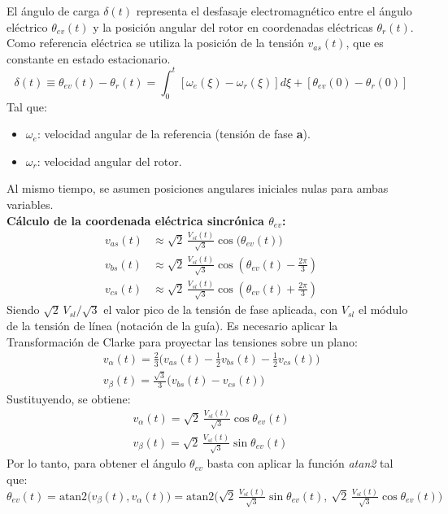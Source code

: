 \documentclass[12pt, a4paper,journal, onecolumn, compsoc]{IEEEtran}
\begin{document}
El ángulo de carga $\delta(t)$ representa el desfasaje electromagnético entre el ángulo eléctrico $\theta_{ev}(t)$ y la posición angular del rotor en coordenadas eléctricas $\theta_r(t)$. Como referencia eléctrica se utiliza la posición de la tensión $v_{as}(t)$, que es constante en estado estacionario.
\begin{equation}\label{eq:angulo_carga}
    \delta(t) \equiv \theta_{ev}(t)-\theta_r(t) = \int_0^t[\omega_e(\xi)-\omega_r(\xi)]d\xi +[\theta_{ev}(0)-\theta_r(0)]
\end{equation}
Tal que:
\begin{itemize}
    \item $\omega_e$: velocidad angular de la referencia (tensión de fase \textbf{a}).
    \item $\omega_r$: velocidad angular del rotor.
\end{itemize}
Al mismo tiempo, se asumen posiciones angulares iniciales nulas para ambas variables.\\
\textbf{Cálculo de la coordenada eléctrica sincrónica $\theta_{ev}$:}
\begin{align*}
v_{as}(t) &\approx \sqrt{2}\,\frac{V_{sl}(t)}{\sqrt{3}} \cos\big(\theta_{ev}(t)\big) \\
v_{bs}(t) &\approx \sqrt{2}\,\frac{V_{sl}(t)}{\sqrt{3}} \cos\left(\theta_{ev}(t) - \frac{2\pi}{3}\right) \\
v_{cs}(t) &\approx \sqrt{2}\,\frac{V_{sl}(t)}{\sqrt{3}} \cos\left(\theta_{ev}(t) + \frac{2\pi}{3}\right)
\end{align*}
Siendo $\sqrt{2}\,V_{sl}/\sqrt{3}$ el valor pico de la tensión de fase aplicada, con $V_{sl}$ el módulo de la tensión de línea (notación de la guía).
Es necesario aplicar la Transformación de Clarke para proyectar las tensiones sobre un plano:
\begin{align*}
    v_{\alpha}(t) = \frac{2}{3}\Big(v_{as}(t) - \frac{1}{2}v_{bs}(t)-\frac{1}{2}v_{cs}(t)\Big) \\
    v_{\beta}(t) = \frac{\sqrt{3}}{3}\big(v_{bs}(t)-v_{cs}(t)\big)
\end{align*}
Sustituyendo, se obtiene:
\begin{align}
    v_{\alpha}(t) = \sqrt{2}\,\tfrac{V_{sl}(t)}{\sqrt{3}} \cos{\theta_{ev}(t)} \\
    v_{\beta}(t) = \sqrt{2}\,\tfrac{V_{sl}(t)}{\sqrt{3}} \sin{\theta_{ev}(t)}
\end{align}
Por lo tanto, para obtener el ángulo $\theta_{ev}$ basta con aplicar la función \textit{atan2} tal que:
\begin{equation}
    \theta_{ev}(t) = \text{atan2}\big(v_{\beta}(t),v_{\alpha}(t)\big)= \text{atan2}\big(\sqrt{2}\,\tfrac{V_{sl}(t)}{\sqrt{3}} \sin{\theta_{ev}(t)},\ \sqrt{2}\,\tfrac{V_{sl}(t)}{\sqrt{3}} \cos{\theta_{ev}(t)}\big)
\end{equation}
\end{document}
